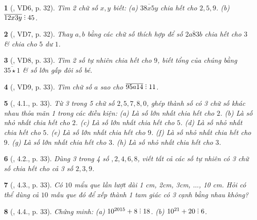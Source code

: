 \documentclass{article}
\newtheorem{baitoan}{}
\DeclareRobustCommand{\divby}{%
	\mathrel{\vbox{\baselineskip.65ex\lineskiplimit0pt\hbox{.}\hbox{.}\hbox{.}}}%
}
\begin{document}
\begin{baitoan}[\cite{Binh_boi_duong_Toan_6_tap_1}, VD6, p. 32]
	Tìm 2 chữ số $x,y$ biết: (a) $\overline{38x5y}$ chia hết cho $2,5,9$. (b) $\overline{12x3y}\divby45$.
\end{baitoan}

\begin{baitoan}[\cite{Binh_boi_duong_Toan_6_tap_1}, VD7, p. 32]
	Thay $a,b$ bằng các chữ số thích hợp để số $ \overline{2a83b}$ chia hết cho $3$ \& chia cho $5$ dư $1$.
\end{baitoan}

\begin{baitoan}[\cite{Binh_boi_duong_Toan_6_tap_1}, VD8, p. 33]
	Tìm 2 số tự nhiên chia hết cho $9$, biết tổng của chúng bằng $\overline{35\star1}$ \& số lớn gấp đôi số bé.
\end{baitoan}

\begin{baitoan}[\cite{Binh_boi_duong_Toan_6_tap_1}, VD9, p. 33]
	Tìm chữ số $a$ sao cho $\overline{95a14}\divby11$.
\end{baitoan}

\begin{baitoan}[\cite{Binh_boi_duong_Toan_6_tap_1}, 4.1., p. 33]
	Từ 3 trong 5 chữ số $2,5,7,8,0$, ghép thành số có 3 chữ số khác nhau thỏa mãn 1 trong các điều kiện: (a) Là số lớn nhất chia hết cho $2$. (b) Là số nhỏ nhất chia hết cho $2$. (c) Là số lớn nhất chia hết cho $5$. (d) Là số nhỏ nhất chia hết cho $5$. (e) Là số lớn nhất chia hết cho $9$. (f) Là số nhỏ nhất chia hết cho $9$. (g) Là số lớn nhất chia hết cho $3$. (h) Là số nhỏ nhất chia hết cho $3$.
\end{baitoan}

\begin{baitoan}[\cite{Binh_boi_duong_Toan_6_tap_1}, 4.2., p. 33]
	Dùng 3 trong 4 số $,2,4,6,8$, viết tất cả các số tự nhiên có 3 chữ số chia hết cho cả 3 số $2,3,9$.
\end{baitoan}

\begin{baitoan}[\cite{Binh_boi_duong_Toan_6_tap_1}, 4.3., p. 33]
	Có $10$ mẩu que lần lượt dài {\rm1 cm, 2cm, 3cm, $\ldots$, 10 cm}. Hỏi có thể dùng cả $10$ mẫu que đó để xếp thành 1 tam giác có 3 cạnh bằng nhau không?
\end{baitoan}

\begin{baitoan}[\cite{Binh_boi_duong_Toan_6_tap_1}, 4.4., p. 33]
	Chứng minh: (a) $10^{2015} + 8\divby18$. (b) $10^{21} + 20\divby6$.
\end{baitoan}
\end{document}
